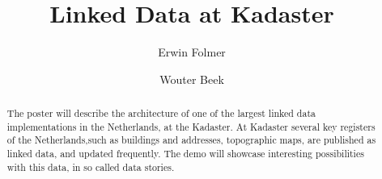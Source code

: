 \documentclass[runningheads,a4paper]{llncs}
\begin{document}
\mainmatter

\title{Linked Data at Kadaster}

\author{Erwin Folmer \and
Wouter Beek}

\maketitle

\begin{abstract}
The poster will describe the architecture of one of the largest linked data implementations in the Netherlands, at the Kadaster. At Kadaster several key registers of the Netherlands,such as buildings and addresses, topographic maps, are published as linked data, and updated frequently. The demo will showcase interesting possibilities with this data, in so called data stories.

\end{abstract}
\end{document}
